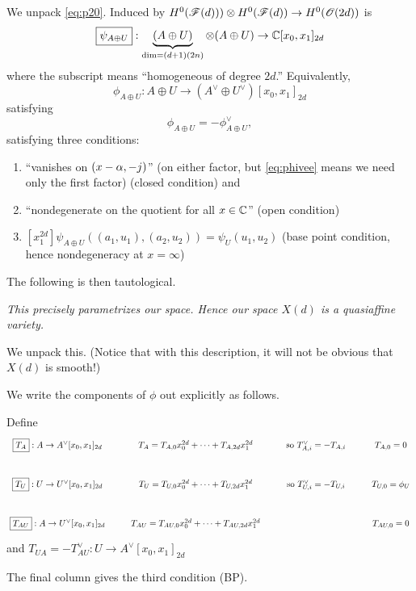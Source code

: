 {

We unpack \eqref{eq:p20}.  Induced by $H^0({\mathscr{F}}(d))) \otimes H^0({\mathscr{F}}(d)) \rightarrow H^0({\mathscr{O}}(2d))$ is
$$
\boxed{\psi_{A \oplus U}} : \underbrace{(A \oplus U)}_{\text{dim}=(d+1)(2n)} \otimes (A \oplus U) \rightarrow \mathbb{C}[x_0, x_1]_{2d}$$
where the subscript means ``homogeneous of degree $2d$.'' Equivalently,
$$
\boxed{\phi_{A \oplus U}} : A \oplus U \rightarrow (A^\vee \oplus U^\vee)[x_0, x_1]_{2d}$$
satisfying \begin{equation}
  \label{eq:phivee}
  \phi_{A \oplus U} = - \phi^\vee_{A \oplus U},
  \end{equation}
satisfying three conditions:
\begin{enumerate}
\item[(V)] ``vanishes on $(x-\alpha, -j)$'' (on either factor, but \eqref{eq:phivee} means we need only the first factor) (closed condition) and
  \item[(ND)]  ``nondegenerate on the quotient for all $x \in \mathbb{C}$''  (open condition)
  \item[(BP)] $[x_1^{2d}] \psi_{A \oplus U} ( (a_1, u_1), (a_2, u_2)) = \psi_U(u_1, u_2)$ (base point condition, hence nondegeneracy at $x =\infty$) 
\end{enumerate}

The following is then tautological.

 {\em This precisely parametrizes our space. Hence our space $X(d)$ is a quasiaffine variety.}

We unpack this.  (Notice that with this description, it will not be obvious that $X(d)$ is smooth!)

We write the components of $\phi$ out explicitly as follows.

Define
$$\xymatrix{\boxed{T_A}: A \rightarrow A^\vee[x_0, x_1]_{2d} &
T_A = T_{A,0}x_0^{2d} + \cdots + T_{A,2d} x_1^{2d} & \text{so } T_{A,i}^\vee = - T_{A,i} & T_{A,0}=0 \\
  \boxed{T_U}: U \rightarrow U^\vee[x_0, x_1]_{2d} & T_U = T_{U,0}x_0^{2d} + \cdots + T_{U,2d} x_1^{2d} & \text{so } T_{U,i}^\vee = - T_{U,i} & T_{U,0}=\phi_U  \\
  \boxed{T_{AU}}: A \rightarrow U^\vee[x_0, x_1]_{2d} & T_{AU} = T_{AU,0}x_0^{2d} + \cdots + T_{AU,2d} x_1^{2d} &  & T_{AU,0}=0
}$$
and $\boxed{T_{UA}} = - T_{AU}^\vee: U \rightarrow A^\vee[x_0, x_1]_{2d}$

The final column gives the third condition (BP).

}
